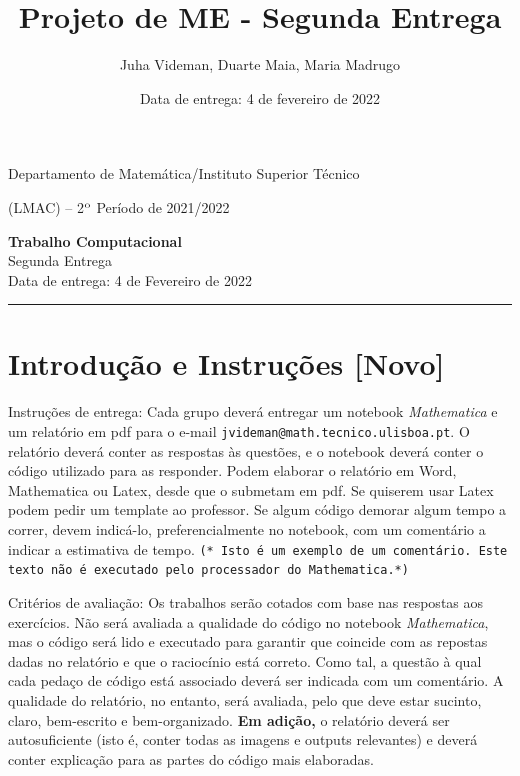 \documentclass{article}
\title{Projeto de ME - Segunda Entrega}
\author{Juha Videman, Duarte Maia, Maria Madrugo}
\date{Data de entrega: 4 de fevereiro de 2022}
\begin{document}

\noindent Departamento de  Matemática/Instituto Superior
Técnico \vspace{3mm}

 ({\small LMAC}) -- 2$^{\rm o}$ Período de 2021/2022

\bigskip

\begin{center}
{\bf\Large   Trabalho Computacional}\\ 
\smallskip
{\large Segunda Entrega}\\
Data de entrega: 4 de Fevereiro de 2022
\end{center}

\bigskip
\hrule

\section*{Introdução e Instruções [Novo]}

Instruções de entrega: Cada grupo deverá entregar um notebook \textit{Mathematica} e um relatório em pdf para o e-mail \texttt{jvideman@math.tecnico.ulisboa.pt}. O relatório deverá conter as respostas às questões, e o notebook deverá conter o código utilizado para as responder. Podem elaborar o relatório em Word, Mathematica ou Latex, desde que o submetam em pdf. Se quiserem usar Latex podem pedir um template ao professor. Se algum código demorar algum tempo a correr, devem indicá-lo, preferencialmente no notebook,  com um comentário a indicar a estimativa de tempo. \texttt{(* Isto é um exemplo de um comentário. Este texto não é executado pelo processador do Mathematica.*)}

\smallskip

Critérios de avaliação: Os trabalhos serão cotados com base nas respostas aos exercícios. Não será avaliada a qualidade do código no notebook \textit{Mathematica}, mas o código será lido e executado para garantir que coincide com as repostas dadas no relatório e que o raciocínio está correto. Como tal, a questão à qual cada pedaço de código está associado deverá ser indicada com um comentário. A qualidade do relatório, no entanto, será avaliada, pelo que deve estar sucinto, claro, bem-escrito e bem-organizado. \textbf{Em adição,} o relatório deverá ser autosuficiente (isto é, conter todas as imagens e outputs relevantes) e deverá conter explicação para as partes do código mais elaboradas. 
\end{document}
